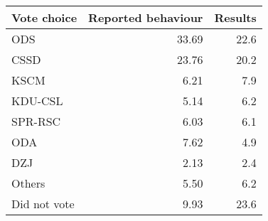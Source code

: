 
\begin{tabular}{l|rr}
\hline
Vote choice & Reported behaviour & Results\\
\hline
ODS & 33.69 & 22.6\\
CSSD & 23.76 & 20.2\\
KSCM & 6.21 & 7.9\\
KDU-CSL & 5.14 & 6.2\\
SPR-RSC & 6.03 & 6.1\\
ODA & 7.62 & 4.9\\
DZJ & 2.13 & 2.4\\
Others & 5.50 & 6.2\\
Did not vote & 9.93 & 23.6\\
\hline
\end{tabular}
